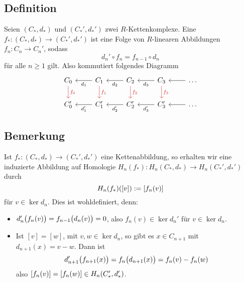 \subsection[Definition: $R$-Kettenabbildung]{Definition} %
\label{sub:61}
Seien $(C_*,d_*)$ und $(C_*',d_*')$ zwei $R$-Kettenkomplexe. Eine 
$f_* \colon (C_*,d_*) \to (C_*',d_*')$ ist eine Folge von $R$-linearen Abbildungen $f_n \colon C_n \to C_n'$, sodass
\[
	d_n' \circ f_n = f_{n-1} \circ d_n
\]
für alle $n\ge 1$ gilt. Also kommutiert folgendes Diagramm
\[
	\begin{tikzcd}[sep=normal]
		C_0 \dar["f_0", Firebrick3] & C_1 \lar["d_1"] \dar["f_1", Firebrick3] & C_2 \lar["d_2"] \dar["f_2", Firebrick3]& C_3 \lar["d_3"] \dar["f_3", Firebrick3]& \ldots \lar \\
		C_0' & C_1' \lar["d_1'"]  & C_2' \lar["d_2'"]& C_3' \lar["d_3'"]& \ldots \lar
	\end{tikzcd}
\]


\subsection[Bemerkung: Induzierte Abbildung einer Kettenabbildung]{Bemerkung} %
\label{sub:62}
Ist $f_* \colon (C_*,d_*) \to (C_*',d_*')$ eine Kettenabbildung, so erhalten wir eine induzierte Abbildung auf Homologie $H_n(f_*) \colon H_n(C_*,d_*) \to H_n(C_*',d_*')$ durch
\[
	H_n(f_*) \enbrace*{[v]} := \benbrace*{f_n(v)}  
\]
für $v \in \ker d_n$. Dies ist wohldefiniert, denn:
\begin{itemize}
	\item $d_n' \enbrace[\big]{f_n(v)} = f_{n-1} \enbrace[\big]{d_n(v)} = 0 $, also $f_n(v) \in \ker d_n'$ für $v \in \ker d_n$.
	\item Ist $[v]=[w]$, mit $v,w \in\ker d_n$, so gibt es $x \in C_{n+1}$ mit $d_{n+1}(x)=v-w$. Dann ist 
	\[
		d_{n+1}'\enbrace[\big]{f_{n+1}(x)} = f_n \enbrace[\big]{d_{n+1}(x)} = f_n(v)- f_n(w) 
	\]
	also $\benbrace*{f_n(v)} = \benbrace*{f_n(w)} \in H_n(C_*',d_*')$.
\end{itemize}


